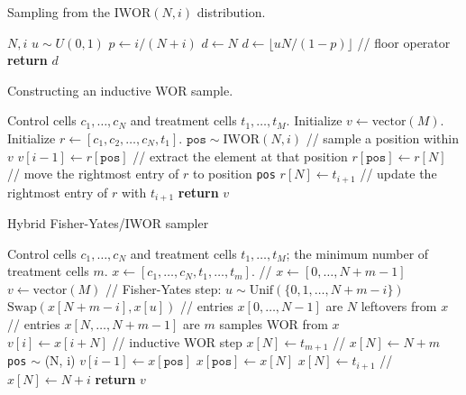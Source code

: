 \documentclass[12pt]{article}
\begin{document}
\begin{algorithm}
	\caption{Sampling from the $\textrm{IWOR}(N,i)$ distribution.}\label{alg:iwor_dist}
	\begin{algorithmic}
		\Require $N, i$ 
		\State $u \sim U(0,1)$
		\State $p \leftarrow i/(N+i)$
		\State $d \leftarrow N$
		\Else 
		\State $d \leftarrow \lfloor uN/(1-p) \rfloor $ // floor operator
		\EndIf
		\State \textbf{return} $d$
	\end{algorithmic}
\end{algorithm}

\begin{algorithm}
	\caption{Constructing an inductive WOR sample.}\label{alg:iwor_sample}
	\begin{algorithmic}
		\Require Control cells $c_1, \dots, c_N$ and treatment cells $t_1, \dots, t_M$.
		\State Initialize $v \leftarrow \textrm{vector}(M).$
		\State Initialize $r \leftarrow [ c_1, c_2, \dots, c_N, t_1 ].$
		\For{i = 1 $\dots$ M }
		\State $\texttt{pos} \sim \textrm{IWOR}(N, i)$ // sample a position within $v$
		\State $v[i-1] \leftarrow r[\texttt{pos}] $ // extract the element at that position
		\State $ r[\texttt{pos}] \leftarrow r[N]$ // move the rightmost entry of $r$ to position \texttt{pos}
		\State $r[N] \leftarrow t_{i+1}$ // update the rightmost entry of $r$ with $t_{i+1}$
		\EndFor
		\State \textbf{return} $v$
	\end{algorithmic}
\end{algorithm}

\begin{algorithm}
\caption{Hybrid Fisher-Yates/IWOR sampler}\label{algo:hybrid}
\begin{algorithmic}[1]
\Require Control cells $c_1, \dots, c_N$ and treatment cells $t_1, \dots, t_M$; the minimum number of treatment cells $m$.
\State $x \leftarrow [c_1, \dots, c_N, t_1, \dots, t_m].$ // $x \leftarrow [0, \dots, N + m - 1]$
\State $v \leftarrow \textrm{vector}(M)$ 
 // Fisher-Yates step:
\State $u \sim \textrm{Unif}(\{0, 1, \dots, N + m - i\})$
\State $\textrm{Swap}(x[N + m - i], x[u])$
\EndFor
\State // entries $x[0, \dots, N - 1]$ are $N$ leftovers from $x$
\State // entries $x[N, \dots, N + m - 1]$ are $m$ samples WOR from $x$
\\
\State $v[i] \leftarrow x[i + N]$
\EndFor
\State // inductive WOR step
\State $x[N] \leftarrow t_{m+1}$ // $x[N] \leftarrow N  + m$
\State \texttt{pos} $\sim$ (N, i)
\State $v[i - 1] \leftarrow x[\texttt{pos}]$
\State $x[\texttt{pos}] \leftarrow x[N]$
\State $x[N] \leftarrow t_{i+1}$ // $x[N] \leftarrow N + i$
\EndFor
\State \textbf{return} $v$
\end{algorithmic}
\end{algorithm}
\end{document}
